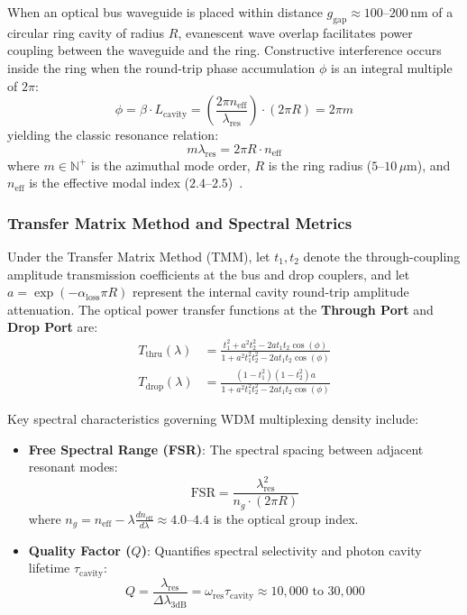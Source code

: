 When an optical bus waveguide is placed within distance $g_{\mathrm{gap}} \approx 100\text{--}200\,\mathrm{nm}$ of a circular ring cavity of radius $R$, evanescent wave overlap facilitates power coupling between the waveguide and the ring. Constructive interference occurs inside the ring when the round-trip phase accumulation $\phi$ is an integral multiple of $2\pi$:
\begin{equation}
\phi = \beta \cdot L_{\mathrm{cavity}} = \left(\frac{2\pi n_{\mathrm{eff}}}{\lambda_{\mathrm{res}}}\right) \cdot (2\pi R) = 2\pi m
\end{equation}
yielding the classic resonance relation:
\begin{equation}
    m \lambda_{\mathrm{res}} = 2 \pi R \cdot n_{\mathrm{eff}}
    \label{eq:mrr-resonance}
\end{equation}
where $m \in \mathbb{N}^+$ is the azimuthal mode order, $R$ is the ring radius ($5\text{--}10\,\mu\mathrm{m}$), and $n_{\mathrm{eff}}$ is the effective modal index ($2.4\text{--}2.5$)~\cite{Little1997,Ye2013}.

\subsubsection{Transfer Matrix Method and Spectral Metrics}
Under the Transfer Matrix Method (TMM), let $t_1, t_2$ denote the through-coupling amplitude transmission coefficients at the bus and drop couplers, and let $a = \exp(-\alpha_{\mathrm{loss}} \pi R)$ represent the internal cavity round-trip amplitude attenuation. The optical power transfer functions at the \textbf{Through Port} and \textbf{Drop Port} are:
\begin{align}
T_{\mathrm{thru}}(\lambda) &= \frac{t_1^2 + a^2 t_2^2 - 2 a t_1 t_2 \cos(\phi)}{1 + a^2 t_1^2 t_2^2 - 2 a t_1 t_2 \cos(\phi)} \label{eq:tmm_thru} \\
T_{\mathrm{drop}}(\lambda) &= \frac{(1 - t_1^2)(1 - t_2^2) a}{1 + a^2 t_1^2 t_2^2 - 2 a t_1 t_2 \cos(\phi)} \label{eq:tmm_drop}
\end{align}

Key spectral characteristics governing WDM multiplexing density include:
\begin{itemize}
    \item \textbf{Free Spectral Range (FSR)}: The spectral spacing between adjacent resonant modes:
    \begin{equation}
    \mathrm{FSR} = \frac{\lambda_{\mathrm{res}}^2}{n_g \cdot (2\pi R)}
    \label{eq:fsr_formula}
    \end{equation}
    where $n_g = n_{\mathrm{eff}} - \lambda \frac{d n_{\mathrm{eff}}}{d\lambda} \approx 4.0\text{--}4.4$ is the optical group index.
    \item \textbf{Quality Factor ($Q$)}: Quantifies spectral selectivity and photon cavity lifetime $\tau_{\mathrm{cavity}}$:
    \begin{equation}
    Q = \frac{\lambda_{\mathrm{res}}}{\Delta \lambda_{3\mathrm{dB}}} = \omega_{\mathrm{res}} \tau_{\mathrm{cavity}} \approx 10{,}000\text{ to }30{,}000
    \label{eq:q_factor}
    \end{equation}~\cite{Little1997}
\end{itemize}

